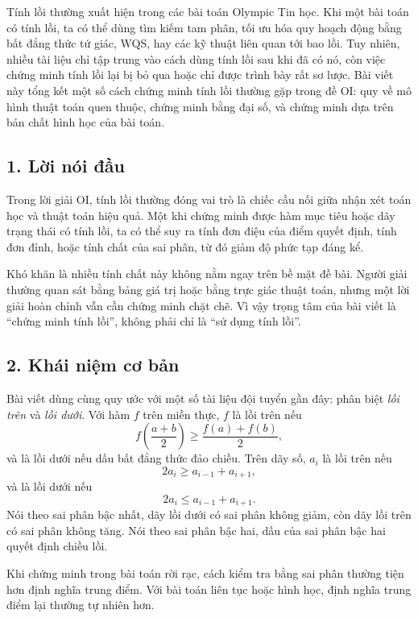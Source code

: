 \documentclass[11pt]{article}
\begin{document}
Tính lồi thường xuất hiện trong các bài toán Olympic Tin học. Khi một bài toán
có tính lồi, ta có thể dùng tìm kiếm tam phân, tối ưu hóa quy hoạch động bằng
bất đẳng thức tứ giác, WQS, hay các kỹ thuật liên quan tới bao lồi. Tuy nhiên,
nhiều tài liệu chỉ tập trung vào cách dùng tính lồi sau khi đã có nó, còn việc
chứng minh tính lồi lại bị bỏ qua hoặc chỉ được trình bày rất sơ lược. Bài
viết này tổng kết một số cách chứng minh tính lồi thường gặp trong đề OI: quy
về mô hình thuật toán quen thuộc, chứng minh bằng đại số, và chứng minh dựa
trên bản chất hình học của bài toán.

\subsection*{1. Lời nói đầu}

Trong lời giải OI, tính lồi thường đóng vai trò là chiếc cầu nối giữa nhận xét
toán học và thuật toán hiệu quả. Một khi chứng minh được hàm mục tiêu hoặc dãy
trạng thái có tính lồi, ta có thể suy ra tính đơn điệu của điểm quyết định,
tính đơn đỉnh, hoặc tính chất của sai phân, từ đó giảm độ phức tạp đáng kể.

Khó khăn là nhiều tính chất này không nằm ngay trên bề mặt đề bài. Người giải
thường quan sát bằng bảng giá trị hoặc bằng trực giác thuật toán, nhưng một
lời giải hoàn chỉnh vẫn cần chứng minh chặt chẽ. Vì vậy trọng tâm của bài viết
là ``chứng minh tính lồi'', không phải chỉ là ``sử dụng tính lồi''.

\subsection*{2. Khái niệm cơ bản}

Bài viết dùng cùng quy ước với một số tài liệu đội tuyển gần đây: phân biệt
\emph{lồi trên} và \emph{lồi dưới}. Với hàm $f$ trên miền thực, $f$ là lồi trên
nếu
\[
  f\!\left(\frac{a+b}{2}\right)\ge
  \frac{f(a)+f(b)}{2},
\]
và là lồi dưới nếu dấu bất đẳng thức đảo chiều. Trên dãy số, $a_i$ là lồi trên
nếu
\[
  2a_i\ge a_{i-1}+a_{i+1},
\]
và là lồi dưới nếu
\[
  2a_i\le a_{i-1}+a_{i+1}.
\]
Nói theo sai phân bậc nhất, dãy lồi dưới có sai phân không giảm, còn dãy lồi
trên có sai phân không tăng. Nói theo sai phân bậc hai, dấu của sai phân bậc
hai quyết định chiều lồi.

Khi chứng minh trong bài toán rời rạc, cách kiểm tra bằng sai phân thường tiện
hơn định nghĩa trung điểm. Với bài toán liên tục hoặc hình học, định nghĩa
trung điểm lại thường tự nhiên hơn.
\end{document}
